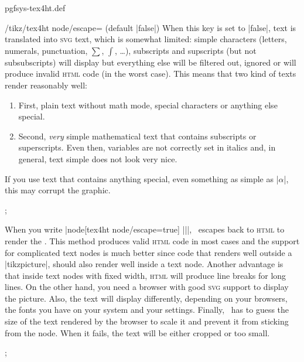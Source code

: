 \begin{filedescription}{pgfsys-tex4ht.def}
\begin{key}{/tikz/tex4ht node/escape= (default |false|)}
    When this key is set to |false|, text is translated into
    \textsc{svg} text, which is somewhat limited: simple 
    characters (letters, numerals, punctuation, $\sum$, $\int$, \ldots),
    subscripts and supscripts (but not subsubscripts) will display but
    everything else will be filtered out, ignored or will produce
    invalid \textsc{html} code (in the worst case). This means that two
    kind of texts render reasonably well:  
    \begin{enumerate}
    \item First, plain text without math mode, special characters or
      anything else special.  
    \item Second, \emph{very} simple mathematical text that contains
      subscripts or superscripts. Even then, variables are not correctly
      set in italics and, in general, text simple does not look very
      nice. 
    \end{enumerate} 
    If you use text that contains anything special, even something as
    simple as |$\alpha$|, this may corrupt the graphic.
    
\begin{codeexample}
\tikz {};          
\end{codeexample}

    When you write |node[tex4ht node/escape=true] {||}|,
    \tikzname\ escapes back to \textsc{html} to render the
    . This method produces valid \textsc{html} code in most
    cases and the support for complicated text nodes is much better since
    code that renders well outside a |{tikzpicture}|, should also
    render well inside a text node. Another advantage is that inside
    text nodes with fixed width, \textsc{html} will produce line
    breaks for long  lines. On the other hand, you need a browser with
    good \textsc{svg} support to display the picture. Also, the text
    will display differently, depending on your browsers, the fonts
    you have on your system and your settings. Finally,
    \tikzname\ has to guess the size of the text rendered by the
    browser to scale it and prevent it from sticking from the
    node. When it fails, the text will be either cropped or too small.  
\begin{codeexample}
\tikz {};          
\end{codeexample}
  \end{key}


\end{filedescription}
